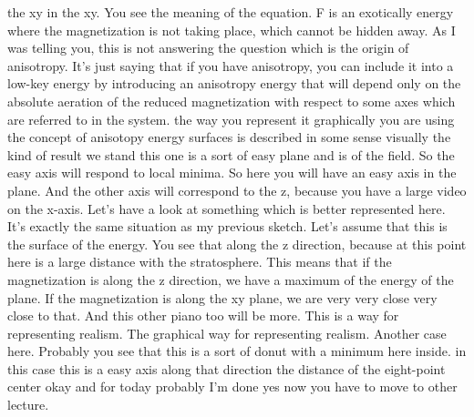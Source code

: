the xy in the xy. You see the meaning of the equation. F is an exotically energy where the magnetization is not taking place, which cannot be hidden away. As I was telling you, this is not answering the question which is the origin of anisotropy. It's just saying that if you have anisotropy, you can include it into a low-key energy by introducing an anisotropy energy that will depend only on the absolute aeration of the reduced magnetization with respect to some axes which are referred to in the system. the way you represent it graphically you are using the concept of anisotopy energy surfaces is described in some sense visually the kind of result we stand this one is a sort of easy plane and is of the field. So the easy axis will respond to local minima. So here you will have an easy axis in the plane. And the other axis will correspond to the z, because you have a large video on the x-axis. Let's have a look at something which is better represented here.
It's exactly the same situation as my previous sketch. Let's assume that this is the surface of the energy. You see that along the z direction, because at this point here is a large distance with the stratosphere. This means that if the magnetization is along the z direction, we have a maximum of the energy of the plane. If the magnetization is along the xy plane, we are very very close very close to that. And this other piano too will be more. This is a way for representing realism. The graphical way for representing realism. Another case here. Probably you see that this is a sort of donut with a minimum here inside. in this case this is a easy axis along that direction the distance of the eight-point center okay and for today probably I'm done yes now you have to move to other lecture.

